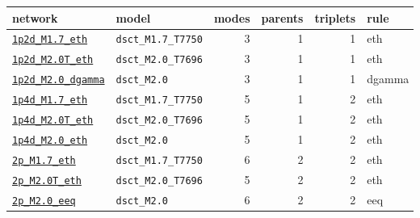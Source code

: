 \begin{tabular}{@{}llrrrl@{}}
\toprule
network & model & modes & parents & triplets & rule \\
\midrule
\hyperref[net:1p2d_M1.7_eth]{\texttt{1p2d\_M1.7\_eth}} & \texttt{dsct\_M1.7\_T7750} & 3 & 1 & 1 & eth \\
\hyperref[net:1p2d_M2.0T_eth]{\texttt{1p2d\_M2.0T\_eth}} & \texttt{dsct\_M2.0\_T7696} & 3 & 1 & 1 & eth \\
\hyperref[net:1p2d_M2.0_dgamma]{\texttt{1p2d\_M2.0\_dgamma}} & \texttt{dsct\_M2.0} & 3 & 1 & 1 & dgamma \\
\hyperref[net:1p4d_M1.7_eth]{\texttt{1p4d\_M1.7\_eth}} & \texttt{dsct\_M1.7\_T7750} & 5 & 1 & 2 & eth \\
\hyperref[net:1p4d_M2.0T_eth]{\texttt{1p4d\_M2.0T\_eth}} & \texttt{dsct\_M2.0\_T7696} & 5 & 1 & 2 & eth \\
\hyperref[net:1p4d_M2.0_eth]{\texttt{1p4d\_M2.0\_eth}} & \texttt{dsct\_M2.0} & 5 & 1 & 2 & eth \\
\hyperref[net:2p_M1.7_eth]{\texttt{2p\_M1.7\_eth}} & \texttt{dsct\_M1.7\_T7750} & 6 & 2 & 2 & eth \\
\hyperref[net:2p_M2.0T_eth]{\texttt{2p\_M2.0T\_eth}} & \texttt{dsct\_M2.0\_T7696} & 5 & 2 & 2 & eth \\
\hyperref[net:2p_M2.0_eeq]{\texttt{2p\_M2.0\_eeq}} & \texttt{dsct\_M2.0} & 6 & 2 & 2 & eeq \\
\bottomrule
\end{tabular}